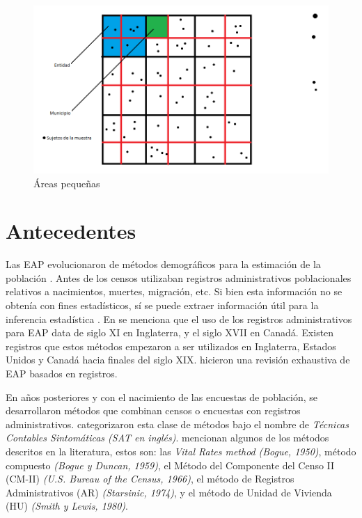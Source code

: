 \documentclass[
  11pt,
  oneside]{book}
\begin{document}
\begin{figure}

{\centering \includegraphics[width=1\linewidth]{imagenes/Imagen 1.1} 

}

\caption{Áreas pequeñas}\label{fig:unnamed-chunk-1}
\end{figure}

\hypertarget{antecedentes}{%
\section*{Antecedentes}\label{antecedentes}}

Las EAP evolucionaron de métodos demográficos para la estimación de la población \citep[p.~55-93]{Gosh&Rao1994} \citep[p.~3]{Mancho2002}. Antes de los censos utilizaban registros administrativos poblacionales relativos a nacimientos, muertes, migración, etc. Si bien esta información no se obtenía con fines estadísticos, sí se puede extraer información útil para la inferencia estadística \citep{Erciulescu2018}. En \citep{Brackstone1987} se menciona que el uso de los registros administrativos para EAP data de siglo XI en Inglaterra, y el siglo XVII en Canadá. Existen registros que estos métodos empezaron a ser utilizados en Inglaterra, Estados Unidos y Canadá hacia finales del siglo XIX. \citep{Zhang2016} hicieron una revisión exhaustiva de EAP basados en registros.

En años posteriores y con el nacimiento de las encuestas de población, se desarrollaron métodos que combinan censos o encuestas con registros administrativos. \citep{Pursell1980} categorizaron esta clase de métodos bajo el nombre de \emph{Técnicas Contables Sintomáticas (SAT en inglés)}. \citep[p.~55-93]{Gosh&Rao1994} mencionan algunos de los métodos descritos en la literatura, estos son: las \emph{Vital Rates method } \emph{(Bogue, 1950)}, método compuesto \emph{(Bogue y Duncan, 1959)}, el Método del Componente del Censo II (CM-II) \emph{(U.S. Bureau of the Census, 1966)}, el método de Registros Administrativos (AR) \emph{(Starsinic, 1974)}, y el método de Unidad de Vivienda (HU) \emph{(Smith y Lewis, 1980)}.
\end{document}
